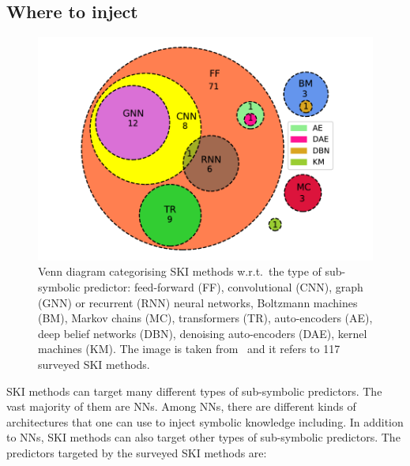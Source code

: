 \subsection{Where to inject}\label{subsec:where-to-inject}
%
\begin{figure}
    \centering
    \includegraphics[width=.6\linewidth]{figures/ski-predictors}
    \caption[Venn diagram categorising SKI methods w.r.t. the predictor type]{
        Venn diagram categorising \gls{SKI} methods w.r.t.\ the type of sub-symbolic predictor: feed-forward (FF), convolutional (CNN), graph (GNN) or recurrent (RNN) neural networks, Boltzmann machines (BM), Markov chains (MC), transformers (TR), auto-encoders (AE), deep belief networks (DBN), denoising auto-encoders (DAE), kernel machines (KM).
        The image is taken from~\cite{DBLP:journals/csur/CiattoSAMO24} and it refers to 117 surveyed \gls{SKI} methods.
    }
    \label{fig:pie-ski-predictors}
\end{figure}
%
\Gls{SKI} methods can target many different types of sub-symbolic predictors.
%
The vast majority of them are \glspl{NN}.
%
Among \glspl{NN}, there are different kinds of architectures that one can use to inject symbolic knowledge including.
%
In addition to \glspl{NN}, \gls{SKI} methods can also target other types of sub-symbolic predictors.
%
The predictors targeted by the surveyed \gls{SKI} methods are:
%
